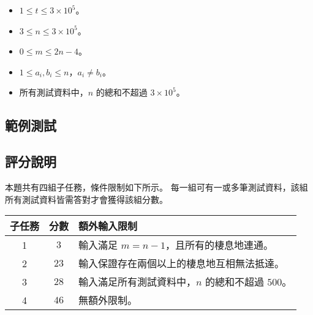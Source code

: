 \begin{itemize}
\tightlist
\item
  \(1 \le t \le 3\times 10^5\)。
\item
  \(3 \le n \le 3\times 10^5\)。
\item
  \(0 \le m \le 2n - 4\)。
\item
  \(1 \le a_i, b_i \le n\)，\(a_i \neq b_i\)。
\item
  所有測試資料中，\(n\) 的總和不超過 \(3\times 10^5\)。
\end{itemize}

\subsection{範例測試}

\begin{example}
%
%
\end{example}

\subsection{評分說明}

本題共有四組子任務，條件限制如下所示。
每一組可有一或多筆測試資料，該組所有測試資料皆需答對才會獲得該組分數。

\begin{longtable}[]{@{}ccl@{}}
\toprule
子任務 & 分數 & 額外輸入限制 \\
\midrule
\endhead
1 & \(3\) & 輸入滿足 \(m = n - 1\)，且所有的棲息地連通。 \\
2 & \(23\) & 輸入保證存在兩個以上的棲息地互相無法抵達。 \\
3 & \(28\) & 輸入滿足所有測試資料中，\(n\) 的總和不超過 \(500\)。 \\
4 & \(46\) & 無額外限制。 \\
\bottomrule
\end{longtable}
